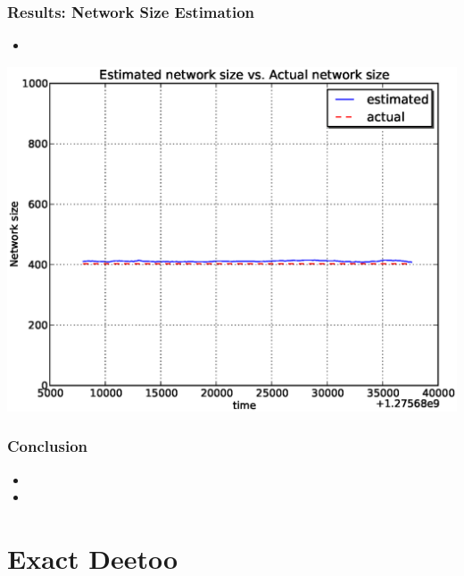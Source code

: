 \documentclass[red]{beamer}
\begin{document}
\begin{frame}
\frametitle{Results: Network Size Estimation}
\begin{itemize}
\item 
\end{itemize}
\begin{center}
\includegraphics[scale=0.4]{figs/plab_size.eps}
\end{center}
\end{frame}

\begin{frame}
\frametitle{Conclusion}
\begin{itemize}
\item 
\item 
\end{itemize}
\end{frame}

\section{Exact Deetoo}
\end{document}
